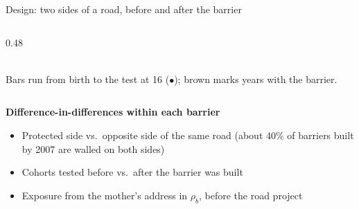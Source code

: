 \documentclass[aspectratio=169, 10pt]{beamer}
\newcommand{\muted}[1]{{\color{black!55}#1}}
\begin{document}
\begin{frame}{Design: two sides of a road, before and after the barrier}
\begin{columns}[T]
\begin{column}{0.48\textwidth}
{}\\[0.3em]
\muted{Bars run from birth to the test at 16 ($\bullet$); brown marks years with the barrier.}
\end{column}
\end{columns}

\medskip
\small
\textbf{Difference-in-differences within each barrier}
\begin{itemize}\setlength{\itemsep}{1pt}
  \item Protected side vs.\ opposite side of the same road (about 40\% of barriers built by 2007 are walled on both sides)
  \item Cohorts tested before vs.\ after the barrier was built
  \item Exposure from the mother's address in $\rho_b$, before the road project
\end{itemize}
\end{frame}
\end{document}
